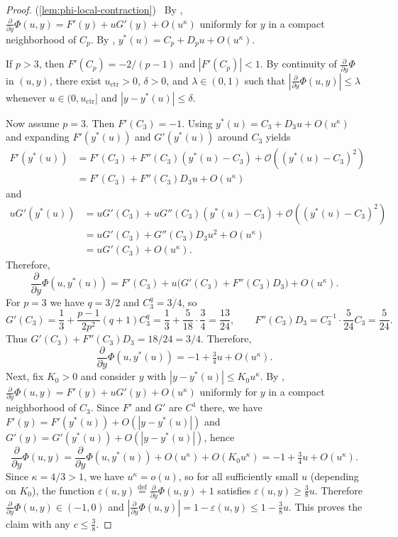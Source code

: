 \documentclass{article}
\newcommand{\defi}{\stackrel{\mathrm{\scriptscriptstyle def}}{=}}
\newcommand{\newtarget}[1]{\hypertarget{#1}{}}
\newcommand\linkofproof[1]{(\cref{#1})\newtarget{proof:#1}\ }
\begin{document}
\begin{proof}\linkofproof{lem:phi-local-contraction}
    By , $\frac{\partial}{\partial y}\Phi(u,y)=F'(y)+uG'(y)+O(u^\kappa)$ uniformly for
    $y$ in a compact neighborhood of $C_p$. By ,
    $y^*(u)=C_p+D_pu+O(u^\kappa)$.

    If $p>3$, then $F'(C_p)=-2/(p-1)$ and $|F'(C_p)|<1$. By continuity of
    $\frac{\partial}{\partial y}\Phi$ in $(u,y)$, there exist $u_{\mathrm{ctr}}>0$, $\delta>0$, and
    $\lambda\in(0,1)$ such that $|\frac{\partial}{\partial y}\Phi(u,y)|\le\lambda$ whenever
    $u\in(0,u_{\mathrm{ctr}}]$ and $|y-y^*(u)|\le\delta$.

    Now assume $p=3$. Then $F'(C_3)=-1$.
    Using $y^*(u)=C_3+D_3u+O(u^\kappa)$ and expanding $F'(y^*(u))$ and $G'(y^*(u))$ around
    $C_3$ yields
    \begin{align*}
        F'(y^*(u)) &= F'(C_3) + F''(C_3)(y^*(u)-C_3) + \mathcal{O}((y^*(u)-C_3)^2) \\
        &= F'(C_3) + F''(C_3)D_3u + O(u^\kappa)
    \end{align*}
    and
    \begin{align*}
        uG'(y^*(u)) &= uG'(C_3) + uG''(C_3)(y^*(u)-C_3) + \mathcal{O}((y^*(u)-C_3)^2) \\
        &= uG'(C_3) + G''(C_3)D_3u^2 + O(u^\kappa)\\
        &= uG'(C_3) + O(u^\kappa).
    \end{align*}
    Therefore,
    \[
        \frac{\partial}{\partial y}\Phi(u,y^*(u)) = F'(C_3) + u\bigl(G'(C_3)+F''(C_3)D_3\bigr) + O(u^\kappa).
    \]
    For $p=3$ we have $q=3/2$ and $C_3^q=3/4$, so
    \[
        G'(C_3)
        = \frac13 + \frac{p-1}{2p^2}(q+1)C_3^q
        = \frac13 + \frac{5}{18}\cdot \frac34
        = \frac{13}{24},
        \qquad
        F''(C_3)D_3
        = C_3^{-1}\cdot \frac{5}{24}C_3
    = \frac{5}{24}.
    \]
    Thus $G'(C_3)+F''(C_3)D_3=18/24=3/4$. Therefore,
    \[
        \frac{\partial}{\partial y}\Phi(u,y^*(u)) = -1+\tfrac34 u + O(u^\kappa).
    \]
    Next, fix $K_0>0$ and consider $y$ with $|y-y^*(u)|\le K_0 u^\kappa$.
    By , $\frac{\partial}{\partial y}\Phi(u,y)=F'(y)+uG'(y)+O(u^\kappa)$ uniformly for
    $y$ in a compact neighborhood of $C_3$. Since $F'$ and $G'$ are $C^1$ there, we
    have $F'(y)=F'(y^*(u))+O(|y-y^*(u)|)$ and
    $G'(y)=G'(y^*(u))+O(|y-y^*(u)|)$, hence
    \[
        \frac{\partial}{\partial y}\Phi(u,y)
        = \frac{\partial}{\partial y}\Phi(u,y^*(u)) + O(u^\kappa) + O(K_0 u^\kappa)
        = -1+\tfrac34 u + O(u^\kappa).
    \]
    Since $\kappa=4/3>1$, we have $u^\kappa=o(u)$, so for all sufficiently small
    $u$ (depending on $K_0$), the function $\varepsilon(u,y)\defi \frac{\partial}{\partial y}\Phi(u,y)+1$
    satisfies $\varepsilon(u,y)\ge \tfrac38 u$.
    Therefore $\frac{\partial}{\partial y}\Phi(u,y)\in(-1,0)$ and
    $|\frac{\partial}{\partial y}\Phi(u,y)| = 1-\varepsilon(u,y) \le 1-\tfrac38 u$.
    This proves the claim with any $c\le \frac{3}{8}$.
\end{proof}
\end{document}

